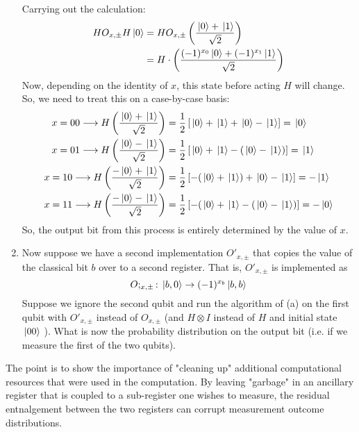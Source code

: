 \documentclass[10pt]{article}
\begin{document}
\begin{enumerate}[label=\alph*)]
			\begin{solution}
				Carrying out the calculation:
				\begin{align*}
					HO_{x, \pm}H\ket*{0} &= HO_{x, \pm}\left( \frac{\ket*{0} + \ket*{1}}{\sqrt{2} } \right) \\
					&= H \cdot \left( \frac{(-1)^{x_0} \ket*{0} + (-1)^{x_1}\ket*{1}}{\sqrt{2} } \right)  
				\end{align*}
				Now, depending on the identity of \( x \), this state before acting \( H \) will change. So, 
				we need to treat this on a case-by-case basis: 
				\begin{align*}
					x = 00 \longrightarrow H\left( \frac{\ket*{0} + \ket*{1}}{\sqrt{2} } \right) 
					&= \frac{1}{2}\left[\ket*{0} + \ket*{1}
				+ \ket*{0} - \ket*{1}\right] = \ket*{0}\\
					x = 01 \longrightarrow H\left( \frac{\ket*{0} - \ket*{1}}{\sqrt{2} } \right) 
					&= \frac{1}{2}\left[\ket*{0} + \ket*{1} - (\ket*{0} - \ket*{1})\right] = \ket*{1} \\
					x = 10 \longrightarrow H\left( \frac{-\ket*{0} + \ket*{1}}{\sqrt{2} } \right) 
					&= \frac{1}{2}\left[ -(\ket*{0} + \ket*{1}) + \ket*{0} - \ket*{1} \right] = -\ket*{1} \\
					x = 11 \longrightarrow H\left( \frac{-\ket*{0} - \ket*{1}}{\sqrt{2} } \right) 
					&= \frac{1}{2}\left[ -(\ket*{0} + \ket*{1} - (\ket*{0} - \ket*{1}) \right] = -\ket*{0} 
				\end{align*}
				So, the output bit from this process is entirely determined by the value of \( x \). 
			\end{solution}
		\item Now suppose we have a second implementation \( O'_{x, \pm} \) that copies the value of the 
			classical bit \( b \) over to a second register. That is, \( O'_{x, \pm} \) is implemented 
			as 
			\[
			O;_{x, \pm} : \ket*{b, 0} \to (-1)^{x_b}\ket*{b, b}
			\] 
			Suppose we ignore the second qubit and run the algorithm of (a) on the first qubit with 
			\( O'_{x, \pm} \) instead of \( O_{x, \pm} \) (and \( H \otimes I \) instead of \( H \) and initial state
			\( \ket*{00} \) ). What is now the probability distribution on the output bit (i.e. if we measure 
			the first of the two qubits).

	\end{enumerate}	
	The point is to show the importance of "cleaning up" additional computational resources that were used in the 
	computation. By leaving "garbage" in an ancillary register that is coupled to a sub-register one 
	wishes to measure, the residual entnalgement between the two registers can corrupt 
	measurement outcome distributions. 
\end{document}
